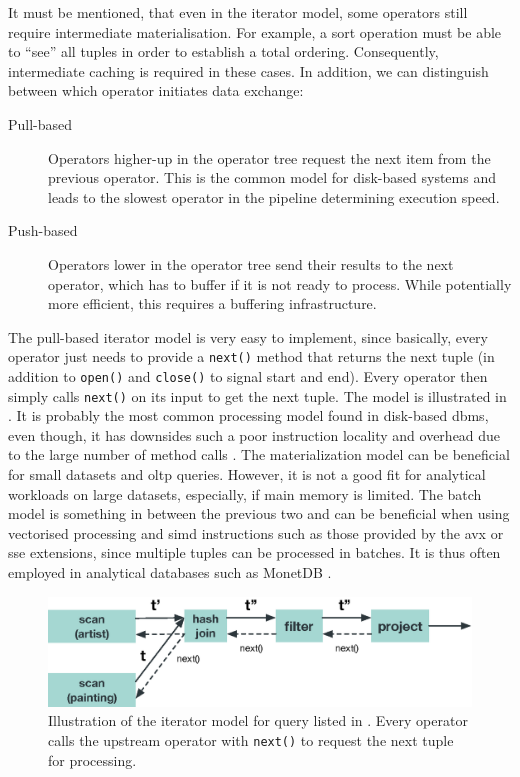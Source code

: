 It must be mentioned, that even in the iterator model, some operators still require intermediate materialisation. For example, a sort operation must be able to ``see'' all tuples in order to establish a total ordering. Consequently, intermediate caching is required in these cases. In addition, we can distinguish between which operator initiates data exchange:

\begin{description}
    \item[Pull-based] Operators higher-up in the operator tree request the next item from the previous operator. This is the common model for disk-based systems and leads to the slowest operator in the pipeline determining execution speed.
    \item[Push-based] Operators lower in the operator tree send their results to the next operator, which has to buffer if it is not ready to process. While potentially more efficient, this requires a buffering infrastructure.
\end{description}

The pull-based iterator model is very easy to implement, since basically, every operator just needs to provide a \texttt{next()} method that returns the next tuple (in addition to \texttt{open()} and \texttt{close()} to signal start and end). Every operator then simply calls  \texttt{next()} on its input to get the next tuple. The model is illustrated in . It is probably the most common processing model found in disk-based \acrshort{dbms}, even though, it has downsides such a poor instruction locality and overhead due to the large number of method calls \cite{Neumann:2014Compiling}. The materialization model can be beneficial for small datasets and \acrshort{oltp} queries. However, it is not a good fit for analytical workloads on large datasets, especially, if main memory is limited. The batch model is something in between the previous two and can be beneficial when using vectorised processing and \acrshort{simd} instructions such as those provided by the \acrshort{avx} or \acrshort{sse} extensions, since multiple tuples can be processed in batches. It is thus often employed in analytical databases such as MonetDB \cite{Idreos:2012MonetDB}.

\begin{figure}[tb]
    \centering
    \includegraphics[width=\textwidth]{figures/iterator-model.eps}
    \caption{Illustration of the iterator model for query listed in . Every operator calls the upstream operator with \texttt{next()} to request the next tuple for processing.}
    \label{figure:iterator_model}
\end{figure}

